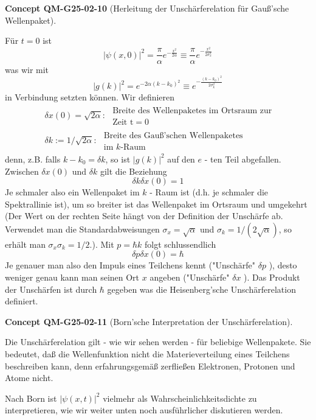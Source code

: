 \documentclass[10pt, letterpaper]{article}
\newcommand{\CustomHeading}[3]{%
  \par\medskip\noindent%
  \textbf{#1 #2} \textnormal{(#3)}.\enskip%
}
\newenvironment{CONC}[2]{\CustomHeading{Concept}{#1}{#2}}{}
\begin{document}
\begin{CONC}{QM-G25-02-10}{Herleitung der Unschärferelation für Gauß'sche Wellenpaket}
Für $t=0$ ist
$$
|\psi(x, 0)|^{2}=\frac{\pi}{\alpha} e^{-\frac{x^{2}}{2 \alpha}} \equiv \frac{\pi}{\alpha} e^{-\frac{x^{2}}{2 \sigma_{x}^{2}}}
$$
was wir mit
$$
|g(k)|^{2}=e^{-2 \alpha\left(k-k_{0}\right)^{2}} \equiv e^{-\frac{\left(k-k_{0}\right)^{2}}{2 \sigma_{k}^{2}}}
$$
in Verbindung setzten können. Wir definieren
$$
\begin{aligned}
& \delta x(0)=\sqrt{2 \alpha}: \begin{array}{l}
\text { Breite des Wellenpaketes im Ortsraum zur } \\
\text { Zeit } \mathrm{t}=0
\end{array} \\
& \delta k:=1 / \sqrt{2 \alpha}: \begin{array}{l}
\text { Breite des Gauß'schen Wellenpaketes } \\
\text { im } k \text {-Raum }
\end{array}
\end{aligned}
$$
denn, z.B. falls $k-k_{0}=\delta k$, so ist $|g(k)|^{2}$ auf den $e$ - ten Teil abgefallen. Zwischen $\delta x(0)$ und $\delta k$ gilt die Beziehung
$$
\delta k \delta x(0)=1
$$
Je schmaler also ein Wellenpaket im $k$ - Raum ist (d.h. je schmaler die Spektrallinie ist), um so breiter ist das Wellenpaket im Ortsraum und umgekehrt (Der Wert on der rechten Seite hängt von der Definition der Unschärfe ab. Verwendet man die Standardabweisungen $\sigma_x=\sqrt{\alpha}$ und $\sigma_k=1 /(2 \sqrt{\alpha})$, so erhält man $\sigma_x \sigma_k=1 / 2$.). Mit $p=\hbar k$ folgt schlussendlich
$$
\delta p \delta x(0)=\hbar
$$
Je genauer man also den Impuls eines Teilchens kennt ("Unschärfe" $\delta p$ ), desto weniger genau kann man seinen Ort $x$ angeben ("Unschärfe" $\delta x$ ). Das Produkt der Unschärfen ist durch $\hbar$ gegeben was die Heisenberg'sche Unschärferelation definiert.
\end{CONC}

\begin{CONC}{QM-G25-02-11}{Born'sche Interpretation der Unschärferelation}
Die Unschärferelation gilt - wie wir sehen werden - für beliebige Wellenpakete. Sie bedeutet, daß die Wellenfunktion nicht die Materieverteilung eines Teilchens beschreiben kann, denn erfahrungsgemäß zerfließen Elektronen, Protonen und Atome nicht.

Nach Born ist $|\psi(x, t)|^{2}$ vielmehr als Wahrscheinlichkeitsdichte zu interpretieren, wie wir weiter unten noch ausführlicher diskutieren werden.
\end{CONC}
\end{document}
